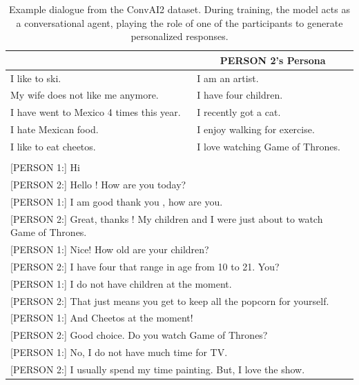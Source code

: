 
\begin{table}[ht]
\centering
\def\arraystretch{1.4}%
\begin{tabular}{|p{7cm}|p{7cm}|}
\hline

\rowcolor[RGB]{204,217,245}
\multicolumn{1}{|c|}{\textbf{PERSON 1's Persona}} & \multicolumn{1}{|c|}{\textbf{PERSON 2's Persona}} \\
\hline
I like to ski. & I am an artist. \\
My wife does not like me anymore. & I have four children. \\
I have went to Mexico 4 times this year. & I recently got a cat. \\
I hate Mexican food. & I enjoy walking for exercise. \\
I like to eat cheetos. & I love watching Game of Thrones. \\
\hline

\rowcolor[RGB]{204,217,245}
\multicolumn{2}{|c|}{\textbf{Dialogue}} \\
\hline

\multicolumn{2}{|p{14cm}|}{[PERSON 1:] Hi} \\
\multicolumn{2}{|p{14cm}|}{[PERSON 2:] Hello ! How are you today?} \\
\multicolumn{2}{|p{14cm}|}{[PERSON 1:] I am good thank you , how are you.} \\
\multicolumn{2}{|p{14cm}|}{[PERSON 2:] Great, thanks ! My children and I were just about to watch Game of Thrones.} \\
\multicolumn{2}{|p{14cm}|}{[PERSON 1:] Nice! How old are your children?} \\
\multicolumn{2}{|p{14cm}|}{[PERSON 2:] I have four that range in age from 10 to 21. You?} \\
\multicolumn{2}{|p{14cm}|}{[PERSON 1:] I do not have children at the moment.} \\
\multicolumn{2}{|p{14cm}|}{[PERSON 2:] That just means you get to keep all the popcorn for yourself.} \\
\multicolumn{2}{|p{14cm}|}{[PERSON 1:] And Cheetos at the moment!} \\
\multicolumn{2}{|p{14cm}|}{[PERSON 2:] Good choice. Do you watch Game of Thrones?} \\
\multicolumn{2}{|p{14cm}|}{[PERSON 1:] No, I do not have much time for TV.} \\
\multicolumn{2}{|p{14cm}|}{[PERSON 2:] I usually spend my time painting. But, I love the show.} \\

\hline
\end{tabular}
\caption{Example dialogue from the ConvAI2 dataset. During training, the model acts as a conversational agent, playing the role of one of the participants to generate personalized responses.}
\label{table:convai2-example}
\end{table}

